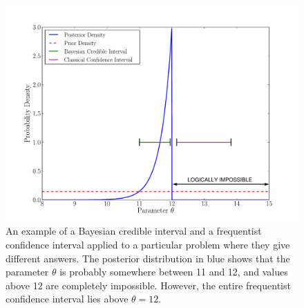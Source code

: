 \begin{figure}[ht!]
\begin{center}
\includegraphics[scale=0.5]{Figures/jaynes.pdf}
\caption{An example of a Bayesian credible interval and a frequentist confidence
interval applied to a particular problem where they give different answers.
The posterior distribution in blue shows that the parameter $\theta$ is probably
somewhere between 11 and 12, and values above 12 are completely impossible.
However, the entire frequentist confidence interval lies above $\theta=12$.
\label{fig:jaynes}}
\end{center}
\end{figure}

